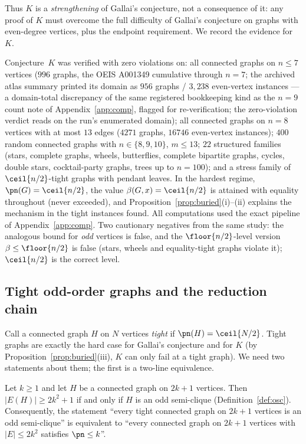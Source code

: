 Thus $K$ is a \emph{strengthening} of Gallai's conjecture, not a consequence of it: any proof
of $K$ must overcome the full difficulty of Gallai's conjecture on graphs with even-degree
vertices, plus the endpoint requirement. We record the evidence for $K$.

\begin{remark}\label{rem:Kevidence}
Conjecture~$K$ was verified with zero violations on: all connected graphs on $n\le7$ vertices
($996$ graphs, the OEIS A001349 cumulative through $n=7$; the archived atlas summary printed
its domain as $956$ graphs / $3{,}238$ even-vertex instances --- a domain-total discrepancy of
the same registered bookkeeping kind as the $n=9$ count note of Appendix~\ref{app:comp},
flagged for re-verification; the zero-violation verdict reads on the run's enumerated domain);
all connected graphs on $n=8$ vertices with at
most $13$ edges ($4271$ graphs, $16746$ even-vertex instances); $400$ random connected graphs
with $n\in\{8,9,10\}$, $m\le13$; $22$ structured families (stars, complete graphs, wheels,
butterflies, complete bipartite graphs, cycles, double stars, cocktail-party graphs, trees up
to $n=100$); and a stress family of $\ceil{n/2}$-tight graphs with pendant leaves. In the
hardest regime, $\pn(G)=\ceil{n/2}$, the value $\beta(G,x)=\ceil{n/2}$ is attained with
equality throughout (never exceeded), and Proposition~\ref{prop:buried}(i)--(ii) explains the
mechanism in the tight instances found. All computations used the exact pipeline of
Appendix~\ref{app:comp}. Two cautionary negatives from the same study: the analogous bound for
\emph{odd} vertices is false, and the $\floor{n/2}$-level version $\beta\le\floor{n/2}$ is
false (stars, wheels and equality-tight graphs violate it); $\ceil{n/2}$ is the correct level.
\end{remark}

\subsection{Tight odd-order graphs and the reduction chain}\label{subsec:tightreduction}

Call a connected graph $H$ on $N$ vertices \emph{tight} if $\pn(H)=\ceil{N/2}$. Tight graphs
are exactly the hard case for Gallai's conjecture and for $K$ (by
Proposition~\ref{prop:buried}(iii), $K$ can only fail at a tight graph). We need two
statements about them; the first is a two-line equivalence.

\begin{proposition}\label{prop:Nequiv}
Let $k\ge1$ and let $H$ be a connected graph on $2k+1$ vertices. Then
$|E(H)|\ge2k^2+1$ if and only if $H$ is an odd semi-clique (Definition~\ref{def:osc}).
Consequently, the statement ``every tight connected graph on $2k+1$ vertices is an odd
semi-clique'' is equivalent to ``every connected graph on $2k+1$ vertices with
$|E|\le2k^2$ satisfies $\pn\le k$''.
\end{proposition}

